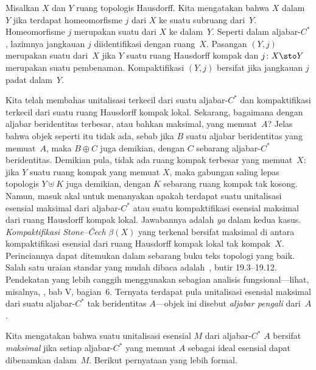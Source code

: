 \begin{defn} Misalkan $X$ dan $Y$ ruang topologis Hausdorff. Kita mengatakan bahwa $X$
 dalam~$Y$ jika terdapat homeomorfisme $j$ dari $X$ ke suatu subruang dari~$Y$.
Homeomorfisme $j$ merupakan suatu
 dari $X$ ke dalam~$Y$. Seperti dalam aljabar-$C^*$, lazimnya
jangkauan $j$ diidentifikasi dengan ruang~$X$. Pasangan $(Y,j)$ merupakan suatu
 dari~$X$ jika $Y$ suatu ruang Hausdorff kompak dan $j\colon X \sto Y$
merupakan suatu pembenaman. Kompaktifikasi $(Y,j)$ bersifat
 jika jangkauan $j$ padat dalam~$Y$.
\end{defn}

Kita telah membahas unitalisasi terkecil dari suatu aljabar-$C^*$ dan kompaktifikasi terkecil
dari suatu ruang Hausdorff kompak lokal. Sekarang, bagaimana dengan aljabar beridentitas terbesar, atau bahkan
maksimal, yang memuat~$A$? Jelas bahwa objek seperti itu tidak ada, sebab jika $B$ suatu
aljabar beridentitas yang memuat~$A$, maka $B \oplus C$ juga demikian, dengan $C$ sebarang
aljabar-$C^*$ beridentitas. Demikian pula, tidak ada ruang kompak terbesar yang memuat~$X$: jika $Y$ suatu
ruang kompak yang memuat $X$, maka gabungan saling lepas topologis $Y \uplus K$ juga demikian,
dengan $K$ sebarang ruang kompak tak kosong. Namun, masuk akal untuk menanyakan apakah
terdapat suatu unitalisasi esensial maksimal dari aljabar-$C^*$ atau suatu kompaktifikasi esensial
maksimal dari ruang Hausdorff kompak lokal. Jawabannya adalah \emph{ya} dalam kedua
kasus. \emph{Kompaktifikasi Stone--\v{C}ech} $\beta(X)$ yang terkenal bersifat maksimal di antara
kompaktifikasi esensial dari ruang Hausdorff kompak lokal tak kompak~$X$. Perinciannya
dapat ditemukan dalam sebarang buku teks topologi yang baik. Salah satu uraian standar yang mudah dibaca
adalah~\cite{Willard:1968}, butir 19.3--19.12. Pendekatan yang lebih canggih menggunakan sebagian
analisis fungsional---lihat, misalnya, \cite{Conway:1990}, bab V, bagian~6. Ternyata
terdapat pula unitalisasi esensial maksimal dari suatu aljabar-$C^*$ tak beridentitas
$A$---objek ini disebut \emph{aljabar pengali} dari~$A$.

Kita mengatakan bahwa suatu unitalisasi esensial $M$ dari aljabar-$C^*$ $A$ bersifat \emph{maksimal} jika setiap
aljabar-$C^*$ yang memuat $A$ sebagai ideal esensial dapat dibenamkan dalam~$M$. Berikut pernyataan yang lebih
formal.

